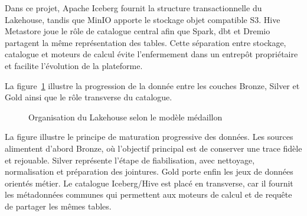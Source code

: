 Dans ce projet, Apache Iceberg fournit la structure transactionnelle du Lakehouse, tandis que MinIO apporte le stockage objet compatible S3. Hive Metastore joue le rôle de catalogue central afin que Spark, dbt et Dremio partagent la même représentation des tables. Cette séparation entre stockage, catalogue et moteurs de calcul évite l'enfermement dans un entrepôt propriétaire et facilite l'évolution de la plateforme.

La figure~\ref{fig:modele-medaillon} illustre la progression de la donnée entre les couches Bronze, Silver et Gold ainsi que le rôle transverse du catalogue.

\begin{figure}[H]
\centering
{}
\caption{Organisation du Lakehouse selon le modèle médaillon}
\label{fig:modele-medaillon}
\end{figure}

La figure illustre le principe de maturation progressive des données. Les sources alimentent d'abord Bronze, où l'objectif principal est de conserver une trace fidèle et rejouable. Silver représente l'étape de fiabilisation, avec nettoyage, normalisation et préparation des jointures. Gold porte enfin les jeux de données orientés métier. Le catalogue Iceberg/Hive est placé en transverse, car il fournit les métadonnées communes qui permettent aux moteurs de calcul et de requête de partager les mêmes tables.

